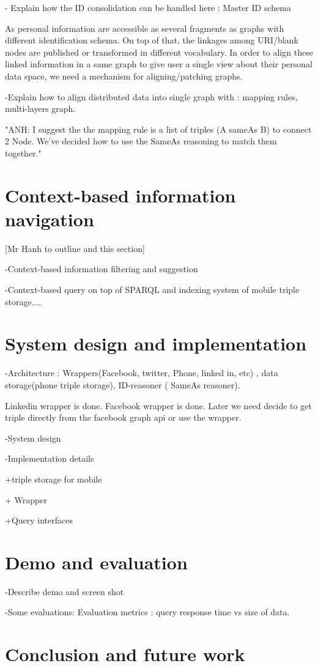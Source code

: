 \documentclass[runningheads,a4paper]{llncs}
\begin{document}
- Explain how the ID consolidation can be handled here : Master ID schema


As personal information are accessible as several fragments as graphs with different identification schema. On top of that, the linkages among 
URI/blank nodes are published or transformed in different vocabulary. In order to align these linked information in a same graph to give user a single
view about their personal data space, we need a mechanism for aligning/patching graphs. 

-Explain how to align distributed data into single graph with : mapping rules, multi-layers graph.
 
"ANH: I suggest the the mapping rule is a list of triples (A sameAs B) to connect 2 Node. We've decided how to use the SameAs reasoning to match them together."


\section{Context-based information navigation}

[Mr Hanh to outline and  this section]
 
-Context-based information filtering and suggestion

-Context-based query on top of SPARQL and indexing system of mobile triple storage....

\section{System design and implementation}

-Architecture : Wrappers(Facebook, twitter, Phone, linked in, etc) , data storage(phone triple storage), 
ID-reasoner ( SameAs reasoner).
   
 Linkedin wrapper is done. 
 Facebook wrapper is done. 
Later we need decide to get triple directly from the facebook graph api or use the wrapper.


-System design

-Implementation details
	
	+triple storage for mobile ~\cite{Furstenau:2009}
	
	+ Wrapper
  
	+Query interfaces 

\section{Demo and evaluation}

-Describe demo and screen shot

-Some evaluations: Evaluation metrics : query response time vs size of data.

\section{Conclusion and future work}

%


\end{document}
